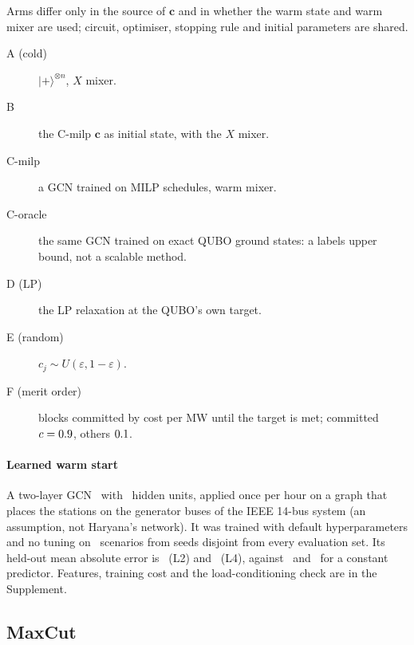 Arms differ only in the source of $\mathbf c$ and in whether the warm state and warm mixer are used; circuit, optimiser, stopping rule and initial parameters are shared.
\begin{description}
\item[A (cold)] $|+\rangle^{\otimes n}$, $X$ mixer.
\item[B] the C-milp $\mathbf c$ as initial state, with the $X$ mixer.
\item[C-milp] a GCN trained on MILP schedules, warm mixer.
\item[C-oracle] the same GCN trained on exact QUBO ground states: a labels upper bound, not a scalable method.
\item[D (LP)] the LP relaxation at the QUBO's own target.
\item[E (random)] $c_j\sim U(\varepsilon,1-\varepsilon)$.
\item[F (merit order)] blocks committed by cost per MW until the target is met; committed $c=0.9$, others $0.1$.
\end{description}

\label{sec:gcn}
\paragraph{Learned warm start} A two-layer GCN~\cite{kipf2017gcn} with \GCNHidden\ hidden units, applied once per hour on a graph that places the stations on the generator buses of the IEEE 14-bus system (an assumption, not Haryana's network). It was trained with default hyperparameters and no tuning on \GCNNTrain\ scenarios from seeds disjoint from every evaluation set. Its held-out mean absolute error is \GCNMaeLtwo\ (L2) and \GCNMaeLfour\ (L4), against \GCNMaeConstLtwo\ and \GCNMaeConstLfour\ for a constant predictor. Features, training cost and the load-conditioning check are in the Supplement.

\subsection{MaxCut}
\label{sec:maxcut}

